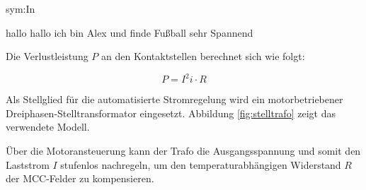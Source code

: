 \gls{sym:In}


\noindent
hallo hallo ich bin Alex und finde Fußball sehr Spannend~\cite[S.3]{book-Einmaleins_Stromwandler-Redur}



\noindent
Die Verlustleistung $P$ an den Kontaktstellen berechnet sich wie folgt:

\begin{equation}
    P = I^2i \cdot R
    \label{eq:verlustleistung}
\end{equation}




\noindent
Als Stellglied für die automatisierte Stromregelung wird ein motorbetriebener Dreiphasen-Stelltransformator eingesetzt. Abbildung \ref{fig:stelltrafo} zeigt das verwendete Modell.


\noindent
Über die Motoransteuerung kann der Trafo die Ausgangsspannung und somit den Laststrom $I$ stufenlos nachregeln, um den temperaturabhängigen Widerstand $R$ der MCC-Felder zu kompensieren.



